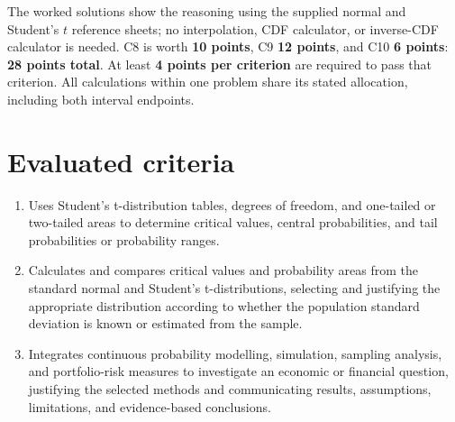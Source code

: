 The worked solutions show the reasoning using the supplied normal and Student's $t$ reference sheets; no interpolation, CDF calculator, or inverse-CDF calculator is needed.
C8 is worth \textbf{10 points}, C9 \textbf{12 points}, and C10 \textbf{6 points}: \textbf{28 points total}.
At least \textbf{4 points per criterion} are required to pass that criterion.
All calculations within one problem share its stated allocation, including both interval endpoints.

\section*{Evaluated criteria}
\begin{enumerate}[label=\textbf{C\arabic*},start=8,leftmargin=3em]
\item Uses Student's t-distribution tables, degrees of freedom, and one-tailed or two-tailed areas to determine critical values, central probabilities, and tail probabilities or probability ranges.
\item Calculates and compares critical values and probability areas from the standard normal and Student's t-distributions, selecting and justifying the appropriate distribution according to whether the population standard deviation is known or estimated from the sample.
\item Integrates continuous probability modelling, simulation, sampling analysis, and portfolio-risk measures to investigate an economic or financial question, justifying the selected methods and communicating results, assumptions, limitations, and evidence-based conclusions.
\end{enumerate}

